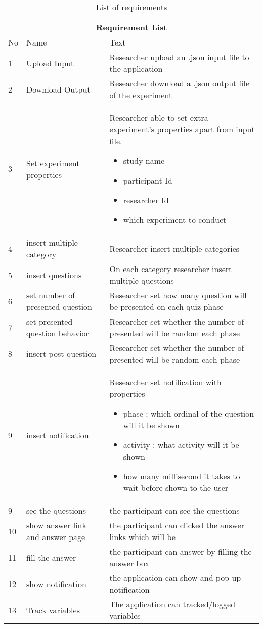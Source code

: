 \begin{table}[!b]
  \centering
	\begin{tabular}{ |p{0.5cm}|p{5cm}|p{10cm}|  }
     \hline
     \multicolumn{3}{|c|}{Requirement List} \\
     \hline
     No& Name & Text \\
     \hline
     1   & Upload Input    & Researcher upload an .json input file to the application\\
     2 & Download Output & Researcher download a .json output file of the experiment\\
     3 & Set experiment properties & Researcher able to set extra experiment's properties apart from input file.
     \begin{itemize}
     \item study name
     \item participant Id
     \item researcher Id
     \item which experiment to conduct
     \end{itemize}\\
     4 & insert multiple category & Researcher insert multiple categories \\
     5 &  insert questions & On each category researcher insert multiple questions\\
     6 & set number of presented question & Researcher set how many question will be presented on each quiz phase   \\
     7 & set presented question behavior &  Researcher set whether the number of presented will be random each phase \\
     8 & insert post question  &  Researcher set whether the number of presented will be random each phase \\
       9 & insert notification  &  Researcher set notification with properties
    \begin{itemize}
    \item phase : which ordinal of the question will it be shown
    \item    activity : what activity will it be shown
    \item how many millisecond  it takes to wait before shown to the user
    \end{itemize}\\
      9 & see the questions  &  the participant can see the questions\\
      10 & show answer link and answer page &  the participant can clicked the answer links which will be  \\
      11 & fill the answer  &  the participant can answer by filling the answer box \\
      12 & show notification  &  the application can show and pop up notification \\
      13 & Track variables  &  The application can tracked/logged variables\\
    \hline
    \end{tabular}
 \caption{List of requirements}
 \label{tab:requirementList}
\end{table}

